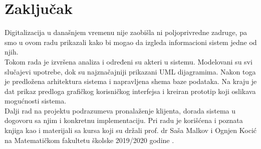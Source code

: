 \documentclass[a4paper, oneside]{article}
\begin{document}
\clearpage

\section{Zaključak}
\indent Digitalizacija u današnjem vremenu nije zaobišla ni poljoprivredne zadruge, pa smo u ovom radu prikazali kako bi mogao da izgleda informacioni sistem jedne od njih. \\
\indent Tokom rada je izvršena analiza i određeni su akteri u sistemu. Modelovani su svi slučajevi upotrebe, dok su najznačajniji prikazani UML dijagramima. Nakon toga je predložena arhitektura sistema i napravljena shema baze podataka. Na kraju je dat prikaz predloga grafičkog korisničkog interfejsa i kreiran prototip koji oslikava mogućnosti sistema. \\ 
\indent Dalji rad na projektu podrazumeva pronalaženje klijenta, dorada sistema u dogovoru sa njim i konkretnu implementaciju.
    Pri radu je korišćena i poznata knjiga \cite{avison} kao i materijali sa kursa koji su držali prof. dr Saša Malkov
    i Ognjen Kocić na Matematičkom fakultetu školske 2019/2020 godine \cite{smalkov}.

\appendix


\end{document}
